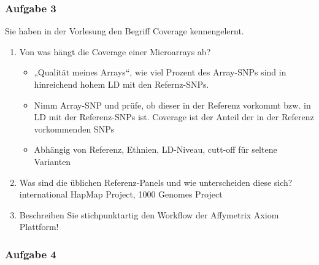 \subsubsection{Aufgabe 3}
Sie haben in der Vorlesung den Begriff Coverage kennengelernt.\\
\begin{enumerate}
	\item Von was hängt die Coverage einer Microarrays ab?
	\begin{itemize}
		\item „Qualität meines Arrays“, wie viel Prozent des Array-SNPs sind in hinreichend hohem LD mit den Refernz-SNPs.
		\item Nimm Array-SNP und prüfe, ob dieser in der Referenz vorkommt bzw. in LD mit der Referenz-SNPs ist. Coverage ist der Anteil der in der Referenz vorkommenden SNPs
		\item Abhängig von Referenz, Ethnien, LD-Niveau, cutt-off für seltene Varianten
	\end{itemize}
	\item Was sind die üblichen Referenz-Panels und wie unterscheiden diese sich? 
international HapMap Project, 1000 Genomes Project
	\item Beschreiben Sie stichpunktartig den Workflow der Affymetrix Axiom Plattform!
\end{enumerate}

\subsubsection{Aufgabe 4}
